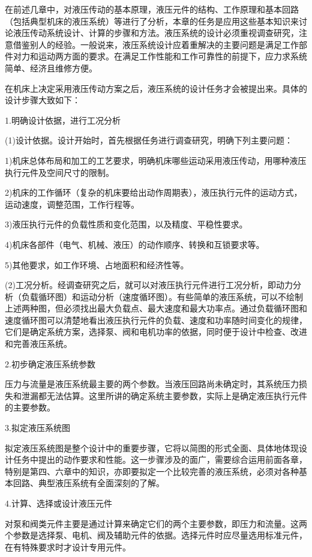 在前述几章中，对液压传动的基本原理，液压元件的结构、工作原理和基本回路（包括典型机床的液压系统）等进行了分析，本章的任务是应用这些基本知识来讨论液压传动系统设计、计算的步骤和方法。液压系统的设计必须重视调查研究，注意借鉴别人的经验。一般说来，液压系统设计应着重解决的主要问题是满足工作部件对力和运动两方面的要求。在满足工作性能和工作可靠性的前提下，应力求系统简单、经济且维修方便。

在机床上决定采用液压传动方案之后，液压系统的设计任务才会被提出来。具体的设计步骤大致如下：

 1.明确设计依据，进行工况分析

(1)设计依据。设计开始时，首先根据任务进行调查研究，明确下列主要问题：

 1)机床总体布局和加工的工艺要求，明确机床哪些运动采用液压传动，用哪种液压执行元件及空间尺寸的限制。

 2)机床的工作循环（复杂的机床要给出动作周期表），液压执行元件的运动方式，运动速度，调整范围，工作行程等。

 3)液压执行元件的负载性质和变化范围，以及精度、平稳性要求。

 4)机床各部件（电气、机械、液压）的动作顺序、转换和互锁要求等。

 5)其他要求，如工作环境、占地面积和经济性等。

 (2)工况分析。经调查研究之后，就可以对液压执行元件进行工况分析，即动力分析（负载循环图）和运动分析（速度循环图）。有些简单的液压系统，可以不绘制上述两种图，但必须找出最大负载点、最大速度和最大功率点。通过负载循环图和速度循环图可以清楚地看出液压执行元件的负载、速度和功率随时间变化的规律，它们是确定系统方案，选择泵、阀和电机功率的依据，同时便于设计中检查、改进和完善液压系统。

 2.初步确定液压系统参数

压力与流量是液压系统最主要的两个参数。当液压回路尚未确定时，其系统压力损失和泄漏都无法估算。这里所讲的确定系统主要参数，实际上是确定液压执行元件的主要参数。

 3.拟定液压系统图

拟定液压系统图是整个设计中的重要步骤，它将以简图的形式全面、具体地体现设计任务中提出的动作要求和性能。这一步骤涉及的面广，需要综合运用前面各章，特别是第四、六章中的知识，亦即要拟定一个比较完善的液压系统，必须对各种基本回路、典型液压系统有全面深刻的了解。

 4.计算、选择或设计液压元件

 对泵和阀类元件主要是通过计算来确定它们的两个主要参数，即压力和流量。这两个参数是选择泵、电机、阀及辅助元件的依据。选择元件时应尽量选用标准元件，在有特殊要求时才设计专用元件。

